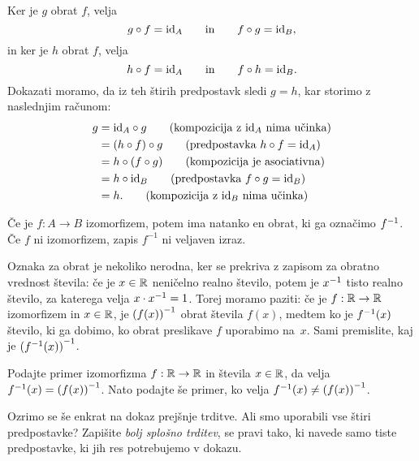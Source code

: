 \begin{dokaz}
  Ker je $g$ obrat $f$, velja
  \begin{equation*}
    g \circ f = \id[A]
    \qquad\text{in}\qquad
    f \circ g = \id[B],
  \end{equation*}
  in ker je $h$ obrat $f$, velja
  \begin{equation*}
    h \circ f = \id[A]
    \qquad\text{in}\qquad
    f \circ h = \id[B].
  \end{equation*}
  Dokazati moramo, da iz teh štirih predpostavk sledi $g = h$, kar storimo z naslednjim
  računom:
  \begin{align*}
    g
    &= \id[A] \circ g \tag{kompozicija z $\id[A]$ nima učinka} \\
    &= (h \circ f) \circ g \tag{predpostavka $h \circ f = \id[A]$} \\
    &= h \circ (f \circ g) \tag{kompozicija je asociativna} \\
    &= h \circ \id[B] \tag{predpostavka $f \circ g = \id[B]$} \\
    &= h. \tag{kompozicija z $\id[B]$ nima učinka}
  \end{align*}
\end{dokaz}

Če je $f : A \to B$ izomorfizem, potem ima natanko en obrat, ki ga označimo $\inv{f}$. Če
$f$ ni izomorfizem, zapis $f^{-1}$ ni veljaven izraz.

Oznaka za obrat je nekoliko nerodna, ker se prekriva z zapisom za obratno vrednost
števila: če je $x \in \RR$ neničelno realno število, potem je $\inv{x}$ tisto realno
število, za katerega velja $x \cdot \inv{x} = 1$. Torej moramo paziti: če je
$f : \RR \to \RR$ izomorfizem in $x \in \RR$, je $\inv{(f(x))}$ obrat števila $f(x)$,
medtem ko je $\inv{f}(x)$ število, ki ga dobimo, ko obrat preslikave $f$ uporabimo na~$x$.
Sami premislite, kaj je $\inv{(\inv{f}(x))}$.

\begin{vaja}
  Podajte primer izomorfizma $f : \RR \to \RR$ in števila $x \in \RR$, da velja
  $\inv{f}(x) = \inv{(f(x))}$. Nato podajte še primer, ko velja
  $\inv{f}(x) \neq \inv{(f(x))}$.
\end{vaja}

\begin{vaja}
  Ozrimo se še enkrat na dokaz prejšnje trditve. Ali smo uporabili vse štiri predpostavke?
  Zapišite \emph{bolj splošno trditev}, se pravi tako, ki navede samo tiste predpostavke,
  ki jih res potrebujemo v dokazu.
\end{vaja}

